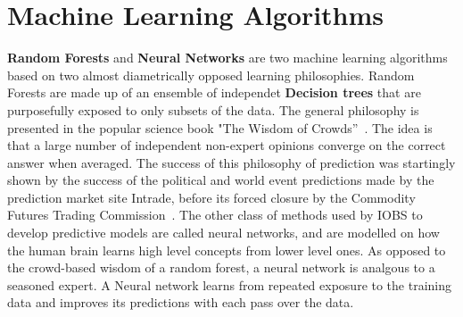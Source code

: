 \documentclass[a4paper,11pt]{article}
\begin{document}
\section{Machine Learning Algorithms}


\textbf{Random Forests} and \textbf{Neural Networks}
are two machine learning algorithms based on two almost diametrically opposed learning philosophies.
Random Forests are made up of an ensemble of independet \textbf{Decision trees} that are purposefully exposed to only subsets of the data. The general philosophy is presented in the popular science book "The Wisdom of Crowds''~\cite{wisdom}.
The idea is that a large number of independent non-expert opinions converge on the correct answer when averaged. The success of this philosophy of prediction was startingly shown by the success of the political and world event predictions made by the prediction market site Intrade, before its forced closure by the Commodity Futures Trading Commission~\cite{cassidy}. %
 The other class of methods used by IOBS to develop predictive models are called neural networks, and are modelled on how the human brain learns high level concepts from lower level ones. 
As opposed to the crowd-based wisdom of a random forest, a neural network is analgous to a seasoned expert. 
A Neural network learns from repeated exposure to the training data and improves its predictions with each pass over the data.
\end{document}
